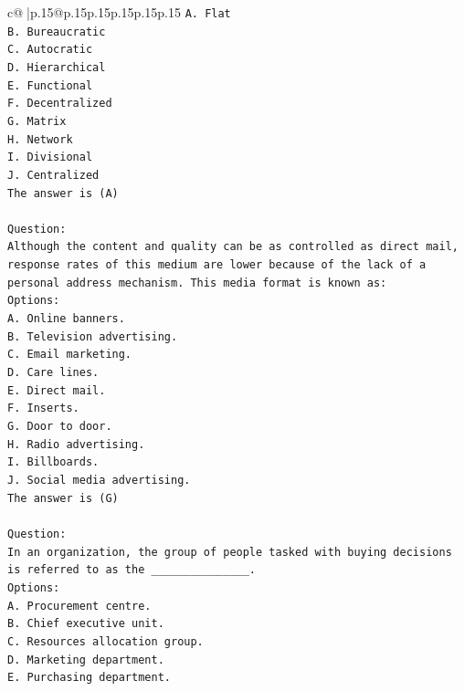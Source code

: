 \documentclass{article}
\begin{document}
{\begin{supertabular}{c@{$\;$}|p{.15\linewidth}@{}p{.15\linewidth}p{.15\linewidth}p{.15\linewidth}p{.15\linewidth}p{.15\linewidth}}
{{{\texttt{A. Flat} \\
\texttt{B. Bureaucratic} \\
\texttt{C. Autocratic} \\
\texttt{D. Hierarchical} \\
\texttt{E. Functional} \\
\texttt{F. Decentralized} \\
\texttt{G. Matrix} \\
\texttt{H. Network} \\
\texttt{I. Divisional} \\
\texttt{J. Centralized} \\
\texttt{The answer is (A)} \\
\\ 
\texttt{Question:} \\
\texttt{Although the content and quality can be as controlled as direct mail, response rates of this medium are lower because of the lack of a personal address mechanism. This media format is known as:} \\
\texttt{Options:} \\
\texttt{A. Online banners.} \\
\texttt{B. Television advertising.} \\
\texttt{C. Email marketing.} \\
\texttt{D. Care lines.} \\
\texttt{E. Direct mail.} \\
\texttt{F. Inserts.} \\
\texttt{G. Door to door.} \\
\texttt{H. Radio advertising.} \\
\texttt{I. Billboards.} \\
\texttt{J. Social media advertising.} \\
\texttt{The answer is (G)} \\
\\ 
\texttt{Question:} \\
\texttt{In an organization, the group of people tasked with buying decisions is referred to as the \_\_\_\_\_\_\_\_\_\_\_\_\_\_\_.} \\
\texttt{Options:} \\
\texttt{A. Procurement centre.} \\
\texttt{B. Chief executive unit.} \\
\texttt{C. Resources allocation group.} \\
\texttt{D. Marketing department.} \\
\texttt{E. Purchasing department.} \\
}}}
\end{supertabular}}
\end{document}
